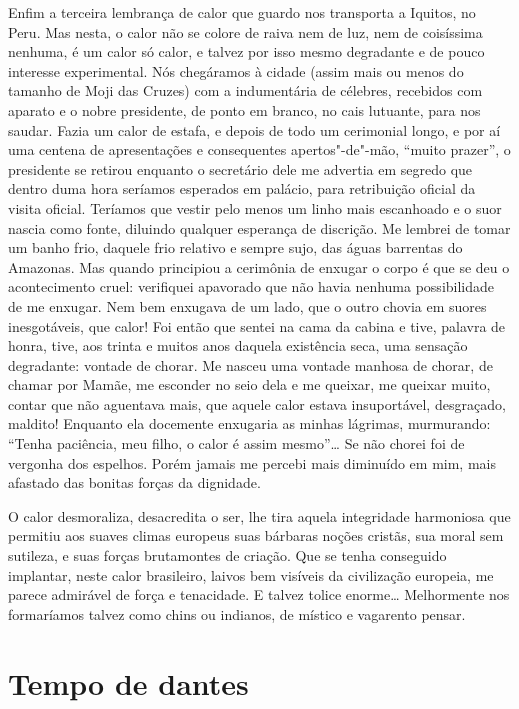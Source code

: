 Enfim a terceira lembrança de calor que guardo nos transporta a Iquitos,
no Peru. Mas nesta, o calor não se colore de raiva nem de luz, nem de
coisíssima nenhuma, é um calor só calor, e talvez por isso mesmo
degradante e de pouco interesse experimental. Nós chegáramos à cidade
(assim mais ou menos do tamanho de Moji das Cruzes) com a indumentária
de célebres, recebidos com aparato e o nobre presidente, de ponto em
branco, no cais lutuante, para nos saudar. Fazia um calor de estafa, e
depois de todo um cerimonial longo, e por aí uma centena de
apresentações e consequentes apertos"-de"-mão, ``muito prazer'', o
presidente se retirou enquanto o secretário dele me advertia em segredo
que dentro duma hora seríamos esperados em palácio, para retribuição
oficial da visita oficial. Teríamos que vestir pelo menos um linho mais
escanhoado e o suor nascia como fonte, diluindo qualquer esperança de
discrição. Me lembrei de tomar um banho frio, daquele frio relativo e
sempre sujo, das águas barrentas do Amazonas. Mas quando principiou a
cerimônia de enxugar o corpo é que se deu o acontecimento cruel:
verifiquei apavorado que não havia nenhuma possibilidade de me enxugar.
Nem bem enxugava de um lado, que o outro chovia em suores inesgotáveis,
que calor! Foi então que sentei na cama da cabina e tive, palavra de
honra, tive, aos trinta e muitos anos daquela existência seca, uma
sensação degradante: vontade de chorar. Me nasceu uma vontade manhosa de
chorar, de chamar por Mamãe, me esconder no seio dela e me queixar, me
queixar muito, contar que não aguentava mais, que aquele calor estava
insuportável, desgraçado, maldito! Enquanto ela docemente enxugaria as
minhas lágrimas, murmurando: ``Tenha paciência, meu filho, o calor é
assim mesmo''\ldots{} Se não chorei foi de vergonha dos espelhos. Porém jamais
me percebi mais diminuído em mim, mais afastado das bonitas forças da
dignidade.

O calor desmoraliza, desacredita o ser, lhe tira aquela integridade
harmoniosa que permitiu aos suaves climas europeus suas bárbaras noções
cristãs, sua moral sem sutileza, e suas forças brutamontes de criação.
Que se tenha conseguido implantar, neste calor brasileiro, laivos bem
visíveis da civilização europeia, me parece admirável de força e
tenacidade. E talvez tolice enorme\ldots{} Melhormente nos formaríamos talvez
como chins ou indianos, de místico e vagarento pensar.

\chapter{Tempo de dantes}

